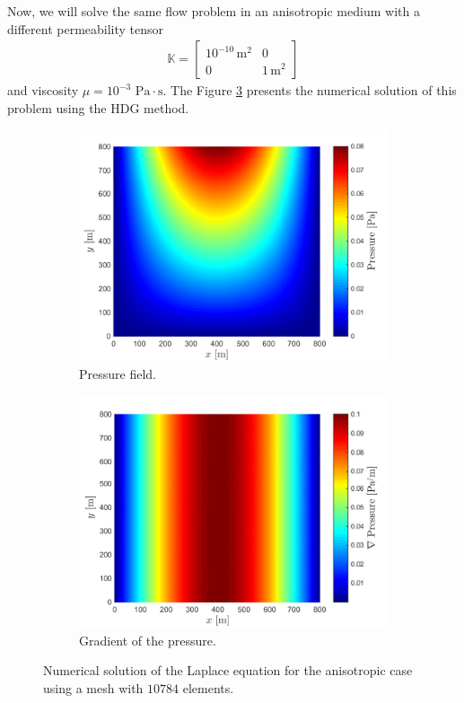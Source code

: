 \documentclass[review]{elsarticle}
\begin{document}
Now, we will solve the same flow problem in an anisotropic medium with a different permeability tensor
\begin{align}\label{Kpermtexas}
\mathbb{K} = \left[\begin{array}{cc}
10^{-10} \, \mathrm{m^2} & 0 \\ 
0 & 1 \, \mathrm{m^2}
\end{array} \right] 
\end{align}
and viscosity $\mu = 10^{-3}$ $\mathrm{Pa}\cdot\mathrm{s}$. The Figure \ref{fig:soltexas2} presents the numerical solution of this problem using the HDG method.

\begin{figure}[H]
	\centering
	\begin{subfigure}[b]{0.45\textwidth}
		\includegraphics[width=\textwidth]{./Figures/Examples/Laplacian_Anisotorpy/soltexas2.pdf}
		\caption{Pressure field.}
		\label{fig:soltexas2p}
	\end{subfigure}
	\begin{subfigure}[b]{0.45\textwidth}
		\includegraphics[width=\textwidth]{./Figures/Examples/Laplacian_Anisotorpy/soltexas2gp.pdf}
		\caption{Gradient of the pressure.}
		\label{fig:soltexas2gp}
	\end{subfigure}
	\caption{Numerical solution of the Laplace equation for the anisotropic case using a mesh with $10784$ elements.}
	\label{fig:soltexas2}
\end{figure}
\end{document}
